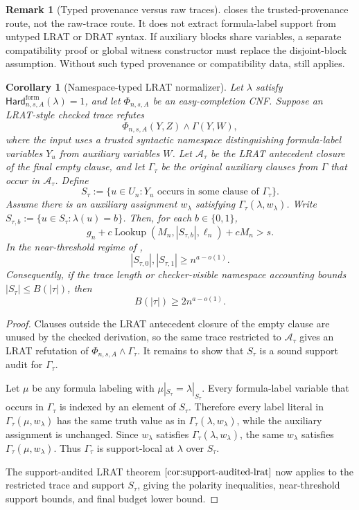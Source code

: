 \documentclass[11pt]{article}
\newtheorem{corollary}[theorem]{Corollary}
\theoremstyle{definition}
\newtheorem{remark}[theorem]{Remark}
\newcommand{\bits}{\{0,1\}}
\newcommand{\Lookup}{\operatorname{Lookup}}
\newcommand{\HardF}{\mathsf{Hard}^{\mathrm{form}}}
\begin{document}
\begin{remark}[Typed provenance versus raw traces]\label{rem:provenance-typed-lrat-scope}
 closes the trusted-provenance route, not the raw-trace route.  It does not extract formula-label support from untyped LRAT or DRAT syntax.  If auxiliary blocks share variables, a separate compatibility proof or global witness constructor must replace the disjoint-block assumption.  Without such typed provenance or compatibility data,  still applies.
\end{remark}

\begin{corollary}[Namespace-typed LRAT normalizer]\label{cor:namespace-typed-lrat}
Let \(\lambda\) satisfy \(\HardF_{n,s,A}(\lambda)=1\), and let \(\Phi_{n,s,A}\) be an easy-completion CNF.  Suppose an LRAT-style checked trace refutes
\[
  \Phi_{n,s,A}(Y,Z)\wedge\Gamma(Y,W),
\]
where the input uses a trusted syntactic namespace distinguishing formula-label variables \(Y_u\) from auxiliary variables \(W\).  Let \(\mathcal A_\tau\) be the LRAT antecedent closure of the final empty clause, and let \(\Gamma_\tau\) be the original auxiliary clauses from \(\Gamma\) that occur in \(\mathcal A_\tau\).  Define
\[
  S_\tau:=\{u\in U_n: Y_u \text{ occurs in some clause of }\Gamma_\tau\}.
\]
Assume there is an auxiliary assignment \(w_\lambda\) satisfying \(\Gamma_\tau(\lambda,w_\lambda)\).  Write \(S_{\tau,b}:=\{u\in S_\tau:\lambda(u)=b\}\).  Then, for each \(b\in\bits\),
\[
  g_n+c\Lookup(M_n,|S_{\tau,b}|,\ell_n)+cM_n>s.
\]
In the near-threshold regime of ,
\[
  |S_{\tau,0}|,|S_{\tau,1}|\ge n^{a-o(1)}.
\]
Consequently, if the trace length or checker-visible namespace accounting bounds \(|S_\tau|\le B(|\tau|)\), then
\[
  B(|\tau|)\ge 2n^{a-o(1)}.
\]
\end{corollary}

\begin{proof}
Clauses outside the LRAT antecedent closure of the empty clause are unused by the checked derivation, so the same trace restricted to \(\mathcal A_\tau\) gives an LRAT refutation of \(\Phi_{n,s,A}\wedge\Gamma_\tau\).  It remains to show that \(S_\tau\) is a sound support audit for \(\Gamma_\tau\).

Let \(\mu\) be any formula labeling with \(\mu|_{S_\tau}=\lambda|_{S_\tau}\).  Every formula-label variable that occurs in \(\Gamma_\tau\) is indexed by an element of \(S_\tau\).  Therefore every label literal in \(\Gamma_\tau(\mu,w_\lambda)\) has the same truth value as in \(\Gamma_\tau(\lambda,w_\lambda)\), while the auxiliary assignment is unchanged.  Since \(w_\lambda\) satisfies \(\Gamma_\tau(\lambda,w_\lambda)\), the same \(w_\lambda\) satisfies \(\Gamma_\tau(\mu,w_\lambda)\).  Thus \(\Gamma_\tau\) is support-local at \(\lambda\) over \(S_\tau\).

The support-audited LRAT theorem \(\Cref{cor:support-audited-lrat}\) now applies to the restricted trace and support \(S_\tau\), giving the polarity inequalities, near-threshold support bounds, and final budget lower bound.
\end{proof}
\end{document}

